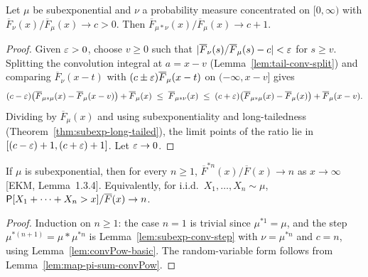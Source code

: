 \begin{lemma}
  \label{lem:subexp-conv-step}
  \leanok
  Let $\mu$ be subexponential and $\nu$ a probability measure concentrated on $[0, \infty)$ with
  $\overline{F}_\nu(x) / \overline{F}_\mu(x) \to c > 0$. Then
  $\overline{F}_{\mu*\nu}(x) / \overline{F}_\mu(x) \to c + 1$.
\end{lemma}
\begin{proof}
  \leanok
  Given $\varepsilon > 0$, choose $v \ge 0$ such that $|\overline{F}_\nu(s)/\overline{F}_\mu(s) - c| < \varepsilon$
  for $s \ge v$. Splitting the convolution integral at $a = x - v$
  (Lemma~\ref{lem:tail-conv-split}) and comparing $\overline{F}_\nu(x - t)$ with
  $(c \pm \varepsilon) \overline{F}_\mu(x - t)$ on $(-\infty, x - v]$ gives
  \begin{align*}
    (c - \varepsilon) \big( \overline{F}_{\mu*\mu}(x) - \overline{F}_\mu(x - v) \big) + \overline{F}_\mu(x)
    \; \le \; \overline{F}_{\mu*\nu}(x) \; \le \;
    (c + \varepsilon) \big( \overline{F}_{\mu*\mu}(x) - \overline{F}_\mu(x) \big) + \overline{F}_\mu(x - v) .
  \end{align*}
  Dividing by $\overline{F}_\mu(x)$ and using subexponentiality and long-tailedness
  (Theorem~\ref{thm:subexp-long-tailed}), the limit points of the ratio lie in
  $[(c - \varepsilon) + 1, (c + \varepsilon) + 1]$. Let $\varepsilon \to 0$.
\end{proof}

\begin{theorem}
  \label{thm:subexp-convPow}
  \leanok
  If $\mu$ is subexponential, then for every $n \ge 1$,
  $\overline{F}^{*n}(x) / \overline{F}(x) \to n$ as $x \to \infty$ [EKM, Lemma~1.3.4].
  Equivalently, for i.i.d.\ $X_1, \ldots, X_n \sim \mu$,
  $\mathsf{P}[X_1 + \cdots + X_n > x] / \overline{F}(x) \to n$.
\end{theorem}
\begin{proof}
  \leanok
  Induction on $n \ge 1$: the case $n = 1$ is trivial since $\mu^{*1} = \mu$, and the step
  $\mu^{*(n+1)} = \mu * \mu^{*n}$ is Lemma~\ref{lem:subexp-conv-step} with $\nu = \mu^{*n}$ and
  $c = n$, using Lemma~\ref{lem:convPow-basic}. The random-variable form follows from
  Lemma~\ref{lem:map-pi-sum-convPow}.
\end{proof}

